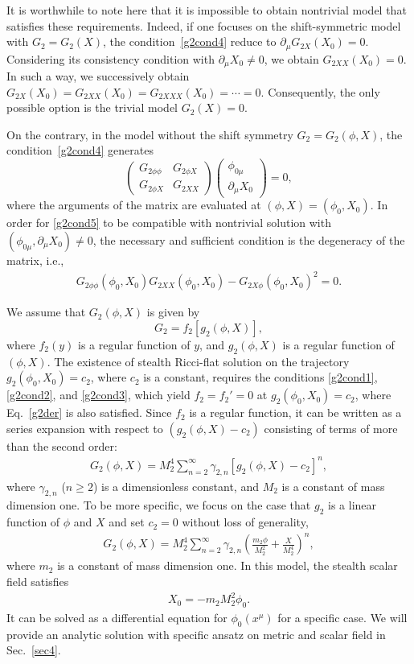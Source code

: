 \documentclass[prd,amsmath,amssymb,floatfix,superscriptaddress,notitlepage,nofootinbib,preprintnumbers]{revtex4-1}
\newcommand{\be}{\begin{equation}}
\newcommand{\ee}{\end{equation}}
\newcommand{\bem}{\begin{pmatrix}}
\newcommand{\eem}{\end{pmatrix}}
\begin{document}
It is worthwhile to note here that it is impossible to obtain nontrivial model that satisfies these requirements.  
Indeed, if one focuses on
the shift-symmetric model with $G_2=G_2(X)$, 
the condition~\eqref{g2cond4} reduce to 
$\partial_\mu G_{2X}(X_0)=0$. 
Considering its consistency condition with $\partial_\mu X_0\neq 0$, 
we obtain $G_{2XX}(X_0)=0$.
In such a way, we successively obtain
$G_{2X}(X_0)=G_{2XX}(X_0)=G_{2XXX}(X_0)=\cdots=0$.
Consequently, the only possible option is the trivial model $G_2(X)=0$.


On the contrary, in 
the model without the shift symmetry $G_2=G_2(\phi,X)$,
the condition~\eqref{g2cond4} generates 
\be \label{g2cond5}
\bem 
G_{2\phi\phi} & G_{2\phi X}\\
G_{2\phi X} & G_{2XX} 
\eem
\bem \phi_{0\mu} \\ \partial_\mu X_{0} \eem
= 0 , \ee
where the arguments of the matrix are evaluated at $(\phi,X)=(\phi_0,X_0)$.
In order for \eqref{g2cond5} to be compatible with nontrivial solution 
with $(\phi_{0\mu},\partial_\mu X_{0})\neq 0$, 
the necessary and sufficient condition is the degeneracy of the matrix, i.e.,
\begin{align}
\label{g2der}
G_{2\phi\phi}(\phi_0,X_0)
G_{2XX} (\phi_0,X_0)
-
G_{2X\phi}(\phi_0,X_0)^2
=0.
\end{align}


We assume that $G_2(\phi,X)$ is given by
\be G_2=f_2\left[ g_2(\phi,X)\right], \ee 
where $f_2(y)$ is a regular function of $y$, and $g_2(\phi,X)$ is a regular function of $(\phi,X)$.
The existence of stealth Ricci-flat solution on the trajectory $g_2(\phi_0, X_0)=c_2$,
where $c_2$ is a constant,
requires the conditions \eqref{g2cond1}, \eqref{g2cond2}, and \eqref{g2cond3},
which yield $f_2=f_2'=0$ at $g_2(\phi_0, X_0)=c_2$,
where Eq.~\eqref{g2der} is also satisfied.
Since $f_2$ is a regular function,
it can be written as a series expansion 
with respect to $(g_2(\phi,X)-c_2)$ 
consisting of terms of more than the second order:
\begin{align}
\label{g2gen}
G_2(\phi,X)= 
M_2^4
\sum_{n=2}^\infty
\gamma_{2,n}
\left[
g_2(\phi,X)
-c_2
\right]^n,
\end{align}
where
$\gamma_{2,n}$ ($n\geq 2$) is a dimensionless constant,
and $M_2$ is a constant of mass dimension one.
To be more specific,
we focus on the case that $g_2$ is a linear function of $\phi$ and $X$ and set $c_2=0$
without loss of generality,
\begin{align}
\label{g2conc}
G_2(\phi,X)= 
M_2^4
\sum_{n=2}^\infty
\gamma_{2,n}
\left(
\frac{m_2\phi}{M_2^2}
+
\frac{X}{M_2^4}
\right)^n,
\end{align}
where $m_2$ is a constant of mass dimension one.
In this model,  
the stealth scalar field satisfies
\begin{align}
\label{g2conc2}
X_0=-m_2 M_2^2 \phi_0.
\end{align}
It can be solved as a differential equation for $\phi_0(x^\mu)$ for a specific case.
We will provide an analytic solution with specific ansatz on metric and scalar field in Sec.~\ref{sec4}.
\end{document}
